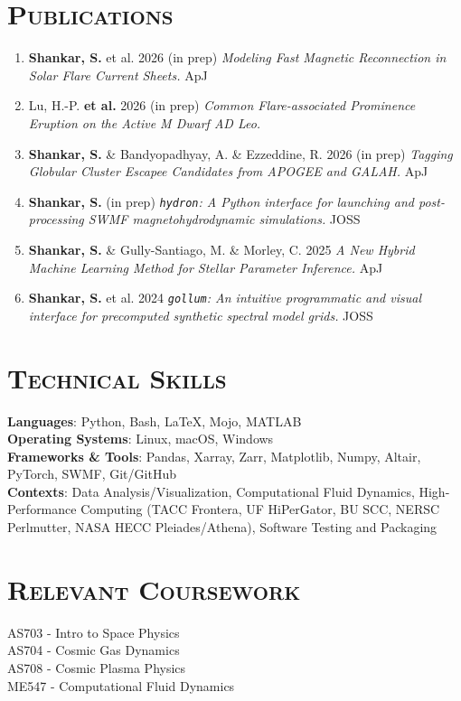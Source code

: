\documentclass[11pt]{article}
\begin{document}
\normalsize
\section{\textsc{Publications}}
\begin{enumerate}
    \item \textbf{Shankar, S.} et al. 2026 (in prep)
    \textit{Modeling Fast Magnetic Reconnection in Solar Flare Current Sheets.} ApJ
    \item Lu, H.-P. \textbf{et al.} 2026 (in prep)
    \textit{Common Flare-associated Prominence Eruption on the Active M Dwarf AD Leo.}
    \item \textbf{Shankar, S.} \& Bandyopadhyay, A. \& Ezzeddine, R. 2026 (in prep)
    \textit{Tagging Globular Cluster Escapee Candidates from APOGEE and GALAH.} ApJ
    \item \textbf{Shankar, S.} (in prep)
    \textit{\texttt{hydron}: A Python interface for launching and post-processing SWMF magnetohydrodynamic simulations.} JOSS
    \item \textbf{Shankar, S.} \& Gully-Santiago, M. \& Morley, C. 2025
    \textit{A New Hybrid Machine Learning Method for Stellar Parameter Inference.} ApJ
    \item \textbf{Shankar, S.} et al. 2024
    \textit{\texttt{gollum}: An intuitive programmatic and visual interface for precomputed synthetic spectral model grids.} JOSS

\end{enumerate}

\section{\textsc{Technical Skills}}
\textbf{Languages}: Python, Bash, \LaTeX, Mojo, MATLAB
\\\textbf{Operating Systems}: Linux, macOS, Windows
\\\textbf{Frameworks \& Tools}: Pandas, Xarray, Zarr, Matplotlib, Numpy, Altair, PyTorch, SWMF, Git/GitHub
\\\textbf{Contexts}: Data Analysis/Visualization, Computational Fluid Dynamics, High-Performance Computing (TACC Frontera, UF HiPerGator, BU SCC, NERSC Perlmutter, NASA HECC Pleiades/Athena), Software Testing and Packaging

\section{\textsc{Relevant Coursework}}
AS703 - Intro to Space Physics \\
AS704 - Cosmic Gas Dynamics \\
AS708 - Cosmic Plasma Physics \\
ME547 - Computational Fluid Dynamics
\end{document}
